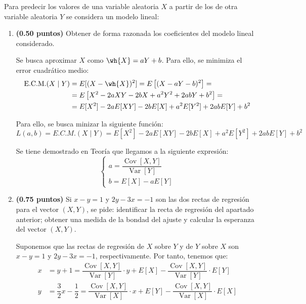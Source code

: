 \documentclass[12pt]{article}
\DeclareMathOperator{\Var}{Var}
\DeclareMathOperator{\Cov}{Cov}
\begin{document}
    \begin{ejercicio}
        Para predecir los valores de una variable aleatoria $X$ a partir de los de otra variable aleatoria $Y$ se considera un modelo lineal:
        \begin{enumerate}
            \item \textbf{(0.50 puntos)} Obtener de forma razonada los coeficientes del modelo lineal considerado.
            
            Se busca aproximar $X$ como $\wh{X}=aY+b$. Para ello, se minimiza el error cuadrático medio:
            \begin{align*}
                \text{E.C.M.}(X\mid Y) &= E[(X-\wh{X})^2]
                = E\left[(X-aY-b)^2\right]
                =\\&= E\left[X^2-2aXY-2bX+a^2Y^2+2abY+b^2\right]
                =\\&= E[X^2]-2aE[XY]-2bE[X]+a^2E[Y^2]+2abE[Y]+b^2
            \end{align*}

            Para ello, se busca minizar la siguiente función:
            \begin{equation*}
                L(a,b) = E.C.M.(X\mid Y) = E[X^2]-2aE[XY]-2bE[X]+a^2E[Y^2]+2abE[Y]+b^2
            \end{equation*}

            Se tiene demostrado en Teoría que llegamos a la siguiente expresión:
            \begin{equation*}
                \begin{cases}
                    a = \dfrac{\Cov[X,Y]}{\Var[Y]} \\
                    b = E[X]-aE[Y]
                \end{cases}
            \end{equation*}

            \item \textbf{(0.75 puntos)} Si $x-y=1$ y $2y-3x=-1$ son las dos rectas de regresión para el vector $(X,Y)$, se pide: identificar la recta de regresión del apartado anterior; obtener una medida de la bondad del ajuste y calcular la esperanza del vector $(X,Y)$.
            
            Suponemos que las rectas de regresión de $X$ sobre $Y$ y de $Y$ sobre $X$ son $x-y=1$ y $2y-3x=-1$, respectivamente. Por tanto, tenemos que:
            \begin{align*}
                x &= y+1 = \dfrac{\Cov[X,Y]}{\Var[Y]}\cdot y + E[X]-\dfrac{\Cov[X,Y]}{\Var[Y]}\cdot E[Y] \\
                y &= \dfrac{3}{2}x-\dfrac{1}{2} = \dfrac{\Cov[X,Y]}{\Var[X]}\cdot x + E[Y]-\dfrac{\Cov[X,Y]}{\Var[X]}\cdot E[X]
            \end{align*}


\end{enumerate}
\end{ejercicio}
\end{document}
